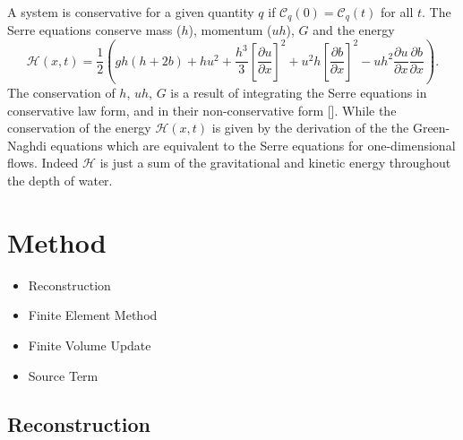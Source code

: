 \documentclass[times]{elsarticle}
\begin{document}
A system is conservative for a given quantity $q$ if $\mathcal{C}_{q}(0) = \mathcal{C}_{q}(t)$ for all $t$. The Serre equations conserve mass ($h$), momentum ($uh$), $G$ and the energy
\begin{equation*}
\mathcal{H}(x,t) = \frac{1}{2} \left( gh\left(h + 2b\right) + hu^2  + \frac{h^3}{3} \left[\frac{\partial u}{\partial x}\right]^2 + u^2h\left[\frac{\partial b}{\partial x}\right]^2 - uh^2 \frac{\partial u}{\partial x} \frac{\partial b}{\partial x}  \right).
\label{eqn:Hamildef}
\end{equation*}
The conservation of $h$, $uh$, $G$ is a result of integrating the Serre equations in conservative law form, and in their non-conservative form []. While the conservation of the energy $\mathcal{H}(x,t)$ is given by the derivation of the the Green-Naghdi equations \cite{Green-Naghdi-1976-237} which are equivalent to the Serre equations for one-dimensional flows. Indeed $\mathcal{H}$ is just a sum of the gravitational and kinetic energy throughout the depth of water. 

\section{Method}
\begin{itemize}
	\item Reconstruction
	\item Finite Element Method
	\item Finite Volume Update
	\item Source Term
\end{itemize}

\subsection{Reconstruction}
\end{document}

